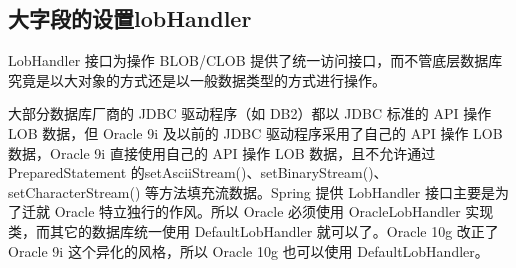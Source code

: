 \documentclass[a4,10pt,oneside,english]{sphinxmanual}
\begin{document}
\subsection{大字段的设置\sphinxhyphen{}\sphinxhyphen{}lobHandler}
\label{\detokenize{interface/spring-jdbc:lobhandler}}
LobHandler 接口为操作 BLOB/CLOB 提供了统一访问接口，而不管底层数据库究竟是以大对象的方式还是以一般数据类型的方式进行操作。

大部分数据库厂商的 JDBC 驱动程序（如 DB2）都以 JDBC 标准的 API 操作 LOB 数据，但 Oracle 9i 及以前的 JDBC 驱动程序采用了自己的 API 操作 LOB 数据，Oracle 9i 直接使用自己的 API 操作 LOB 数据，且不允许通过 PreparedStatement 的setAsciiStream()、setBinaryStream()、setCharacterStream() 等方法填充流数据。Spring 提供 LobHandler 接口主要是为了迁就 Oracle 特立独行的作风。所以 Oracle 必须使用 OracleLobHandler 实现类，而其它的数据库统一使用 DefaultLobHandler 就可以了。Oracle 10g 改正了 Oracle 9i 这个异化的风格，所以 Oracle 10g 也可以使用 DefaultLobHandler。


\begin{sphinxVerbatim}[commandchars=\\\{\}]
 
 
     
\end{sphinxVerbatim}


\begin{sphinxVerbatim}[commandchars=\\\{\}]
 
  
\end{sphinxVerbatim}
\end{document}
